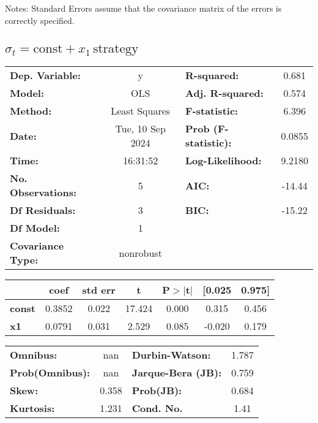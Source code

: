\documentclass{article}
\begin{document}
Notes: \newline
[1] Standard Errors assume that the covariance matrix of the errors is correctly specified.

\subsection{$\sigma_t = \text{const} + x_1\,\text{strategy}$}

\begin{center}
    \begin{tabular}{lclc}
        \toprule
        \textbf{Dep. Variable:}    & y                & \textbf{  R-squared:         } & 0.681  \\
        \textbf{Model:}            & OLS              & \textbf{  Adj. R-squared:    } & 0.574  \\
        \textbf{Method:}           & Least Squares    & \textbf{  F-statistic:       } & 6.396  \\
        \textbf{Date:}             & Tue, 10 Sep 2024 & \textbf{  Prob (F-statistic):} & 0.0855 \\
        \textbf{Time:}             & 16:31:52         & \textbf{  Log-Likelihood:    } & 9.2180 \\
        \textbf{No. Observations:} & 5                & \textbf{  AIC:               } & -14.44 \\
        \textbf{Df Residuals:}     & 3                & \textbf{  BIC:               } & -15.22 \\
        \textbf{Df Model:}         & 1                & \textbf{                     } &        \\
        \textbf{Covariance Type:}  & nonrobust        & \textbf{                     } &        \\
        \bottomrule
    \end{tabular}
    \begin{tabular}{lcccccc}
                       & \textbf{coef} & \textbf{std err} & \textbf{t} & \textbf{P$> |$t$|$} & \textbf{[0.025} & \textbf{0.975]} \\
        \midrule
        \textbf{const} & 0.3852        & 0.022            & 17.424     & 0.000               & 0.315           & 0.456           \\
        \textbf{x1}    & 0.0791        & 0.031            & 2.529      & 0.085               & -0.020          & 0.179           \\
        \bottomrule
    \end{tabular}
    \begin{tabular}{lclc}
        \textbf{Omnibus:}       & nan   & \textbf{  Durbin-Watson:     } & 1.787 \\
        \textbf{Prob(Omnibus):} & nan   & \textbf{  Jarque-Bera (JB):  } & 0.759 \\
        \textbf{Skew:}          & 0.358 & \textbf{  Prob(JB):          } & 0.684 \\
        \textbf{Kurtosis:}      & 1.231 & \textbf{  Cond. No.          } & 1.41  \\
        \bottomrule
    \end{tabular}
\end{center}
\end{document}
